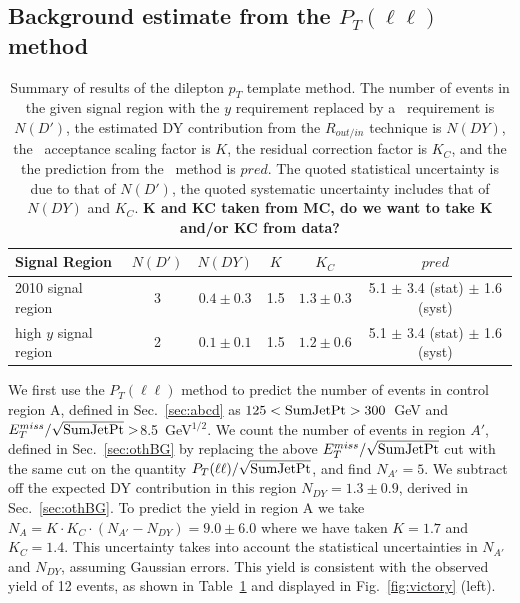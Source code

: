 \subsection{Background estimate from the $P_T(\ell\ell)$ method}
\label{sec:victoryres}

\begin{table}[hbt]
\begin{center}
\caption{\label{tab:victory} 
Summary of results of the dilepton $p_{T}$ template method.
The number of events in the given signal region with the $y$ requirement replaced by a \ptht\
requirement is $N(D')$, the estimated DY contribution from the $R_{out/in}$ technique is $N(DY)$,
the \met\ acceptance scaling factor is $K$, the residual correction factor is $K_C$, and
the the prediction from the \ptll\ method is $pred$. The quoted statistical uncertainty is due to
that of $N(D')$, the quoted systematic uncertainty includes that of $N(DY)$ and $K_C$.
{\color{red} \bf K and KC taken from MC, do we want to take K and/or KC from data? }
}
\begin{tabular}{lccccc}
\hline
Signal Region          &  $N(D')$   &   $N(DY)$         &  $K$   &   $K_C$          & $pred$  \\ 
\hline
2010 signal region     &      3     &   $0.4 \pm 0.3$   &  1.5   &   $1.3 \pm 0.3$  & 5.1 $\pm$ 3.4 (stat) $\pm$ 1.6 (syst) \\
high $y$ signal region &      2     &   $0.1 \pm 0.1$   &  1.5   &   $1.2 \pm 0.6$  & 5.1 $\pm$ 3.4 (stat) $\pm$ 1.6 (syst) \\


\end{tabular}
\end{center}
\end{table}


We first use the $P_T(\ell \ell)$ method to predict the number of events 
in control region A, defined in Sec.~\ref{sec:abcd} as 
$125<{\rm SumJetPt}>300$~GeV and $E_{T}^{miss}/\sqrt{\rm SumJetPt}>$8.5~GeV$^{1/2}$.
We count the number of events in region
$A'$, defined in Sec.~\ref{sec:othBG} by replacing the above $E_{T}^{miss}/\sqrt{\rm SumJetPt}$
cut with the same cut on the quantity $P_T(\ell\ell)/\sqrt{\rm SumJetPt}$,
and find $N_{A'}=5$. We subtract off the expected DY contribution in this region
$N_{DY} = 1.3 \pm 0.9$, derived in Sec.~\ref{sec:othBG}.
To predict the yield in region A we take 
$N_A = K \cdot K_C \cdot ( N_{A'} - N_{DY} ) = 9.0 \pm 6.0$
where we have taken $K = 1.7$ and $K_C = 1.4$.
This uncertainty takes into account the statistical uncertainties in $N_{A'}$ and $N_{DY}$,
assuming Gaussian errors. This yield is consistent
with the observed yield of 12 events, as shown in 
Table~\ref{tab:victory} and displayed in Fig.~\ref{fig:victory} (left).

